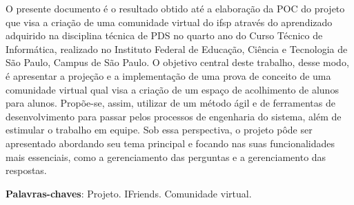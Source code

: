 
\setlength{\absparsep}{18pt} %
\begin{resumo}

O presente documento é o resultado obtido até a elaboração da \acs{POC} do projeto que visa a criação de uma comunidade virtual do \acs{ifsp} através do aprendizado adquirido na disciplina técnica de PDS no quarto ano do Curso Técnico de Informática, realizado no Instituto Federal de Educação, Ciência e Tecnologia de São Paulo, Campus de São Paulo. O objetivo central deste trabalho, desse modo, é apresentar a projeção e a implementação de uma prova de conceito de uma comunidade virtual qual visa a criação de um espaço de acolhimento de alunos para alunos. Propõe-se, assim, utilizar de um método ágil e de ferramentas de desenvolvimento para passar pelos processos de engenharia do sistema, além de estimular o trabalho em equipe. Sob essa perspectiva, o projeto pôde ser apresentado abordando seu tema principal e focando nas suas funcionalidades mais essenciais, como a gerenciamento das perguntas e a gerenciamento das respostas.


\textbf{Palavras-chaves}: Projeto. IFriends. Comunidade virtual.
\end{resumo}


